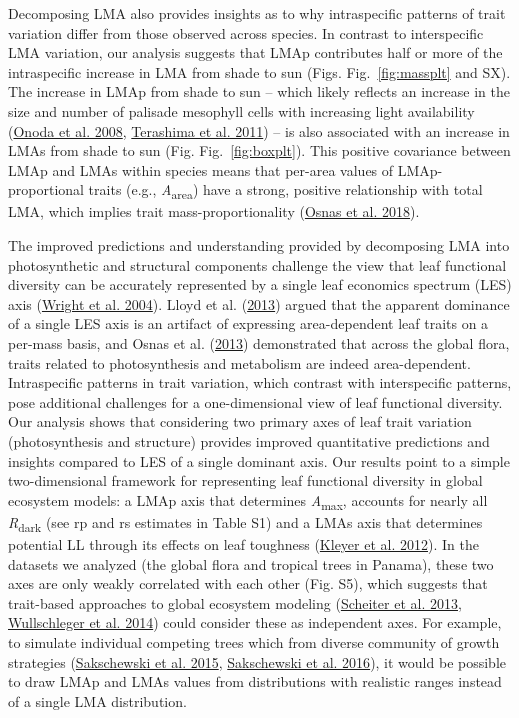 \documentclass[
  12pt,
  a4paper,
,tablecaptionabove
]{scrartcl}
\begin{document}
Decomposing LMA also provides insights as to why intraspecific patterns of trait variation differ from those observed across species.
In contrast to interspecific LMA variation, our analysis suggests that LMAp contributes half or more of the intraspecific increase in LMA from shade to sun (Figs. Fig.~\ref{fig:massplt} and SX).
The increase in LMAp from shade to sun -- which likely reflects an increase in the size and number of palisade mesophyll cells with increasing light availability (\protect\hyperlink{ref-Onoda2008}{Onoda et al. 2008}, \protect\hyperlink{ref-Terashima2011}{Terashima et al. 2011}) -- is also associated with an increase in LMAs from shade to sun (Fig. Fig.~\ref{fig:boxplt}).
This positive covariance between LMAp and LMAs within species means that per-area values of LMAp-proportional traits (e.g., \emph{A}\textsubscript{area}) have a strong, positive relationship with total LMA, which implies trait mass-proportionality (\protect\hyperlink{ref-Osnas2018}{Osnas et al. 2018}).

The improved predictions and understanding provided by decomposing LMA into photosynthetic and structural components challenge the view that leaf functional diversity can be accurately represented by a single leaf economics spectrum (LES) axis (\protect\hyperlink{ref-Wright2004a}{Wright et al. 2004}).
Lloyd et al. (\protect\hyperlink{ref-Lloyd2013}{2013}) argued that the apparent dominance of a single LES axis is an artifact of expressing area-dependent leaf traits on a per-mass basis, and Osnas et al. (\protect\hyperlink{ref-Osnas2013}{2013}) demonstrated that across the global flora, traits related to photosynthesis and metabolism are indeed area-dependent.
Intraspecific patterns in trait variation, which contrast with interspecific patterns, pose additional challenges for a one-dimensional view of leaf functional diversity. Our analysis shows that considering two primary axes of leaf trait variation (photosynthesis and structure) provides improved quantitative predictions and insights compared to LES of a single dominant axis.
Our results point to a simple two-dimensional framework for representing leaf functional diversity in global ecosystem models: a LMAp axis that determines \emph{A}\textsubscript{max}, accounts for nearly all \emph{R}\textsubscript{dark} (see rp and rs estimates in Table S1) and a LMAs axis that determines potential LL through its effects on leaf toughness (\protect\hyperlink{ref-Kleyer2012}{Kleyer et al. 2012}).
In the datasets we analyzed (the global flora and tropical trees in Panama), these two axes are only weakly correlated with each other (Fig. S5), which suggests that trait-based approaches to global ecosystem modeling (\protect\hyperlink{ref-Scheiter2013}{Scheiter et al. 2013}, \protect\hyperlink{ref-Wullschleger2014}{Wullschleger et al. 2014}) could consider these as independent axes.
For example, to simulate individual competing trees which from diverse community of growth strategies (\protect\hyperlink{ref-Sakschewski2015}{Sakschewski et al. 2015}, \protect\hyperlink{ref-Sakschewski2016}{Sakschewski et al. 2016}), it would be possible to draw LMAp and LMAs values from distributions with realistic ranges instead of a single LMA distribution.
\end{document}
